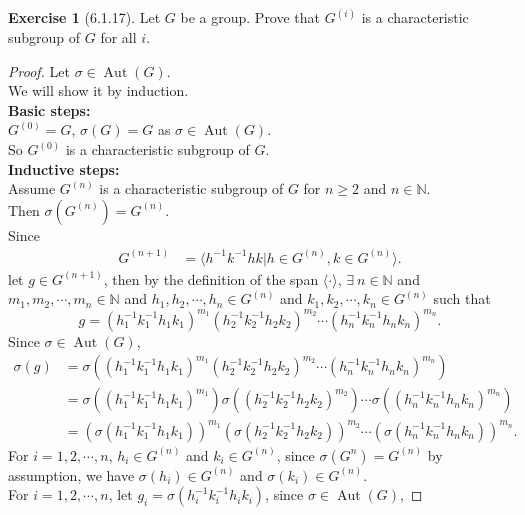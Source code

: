 \documentclass{amsart}
\newcommand{\bbn}{\mathbb{N}}
\theoremstyle{plain}
\theoremstyle{definition}
\newtheorem{exer}[lem]{Exercise}
\begin{document}
\begin{exer}[6.1.17]
Let $G$ be a group. 
Prove that $G^{(i)}$ is a characteristic subgroup of $G$ for all $i$. 
\begin{proof}
	Let $\sigma \in \operatorname{Aut}(G)$.\\
	We will show it by induction.\\
	\textbf{Basic steps:}\\
	$G^{(0)} = G$, $\sigma(G) = G$ as $\sigma\in \operatorname{Aut}(G)$.\\
	So $G^{(0)}$ is a characteristic subgroup of $G$.\\
	\textbf{Inductive steps:}\\
	Assume $G^{(n)}$ is a characteristic subgroup of $G$ for $n \geq 2$ and $n \in \bbn$.\\
	Then $\sigma(G^{(n)}) = G^{(n)}$.\\
	Since 
  	\begin{align*}
	  G^{(n+1)} &= \langle h^{-1}k^{-1}hk|h \in G^{(n)}, k \in G^{(n)}\rangle.
  	\end{align*}
  	let $g \in G^{(n+1)}$, then by the definition of the span $\langle\cdot\rangle$, $\exists \ n \in \bbn$ and $m_1,m_2,\cdots,m_n \in \bbn$ and $h_1,h_2,\cdots,h_n \in G^{(n)}$ and $k_1,k_2,\cdots,k_n \in G^{(n)}$ such that
  	\[g = \left(h_1^{-1}k_1^{-1}h_1k_1\right)^{m_1}\left(h_2^{-1}k_2^{-1}h_2k_2\right)^{m_2}\cdots \left(h_n^{-1}k_n^{-1}h_nk_n\right)^{m_n} .\]
  	Since $\sigma \in \operatorname{Aut}(G)$, 
  	\begin{align*}
  	  \sigma(g) &= \sigma \left(\left(h_1^{-1}k_1^{-1}h_1k_1\right)^{m_1}\left(h_2^{-1}k_2^{-1}h_2k_2\right)^{m_2}\cdots \left(h_n^{-1}k_n^{-1}h_nk_n\right)^{m_n}  \right)\\
  	  			  	   	&=\sigma \left(\left(h_1^{-1}k_1^{-1}h_1k_1\right)^{m_1}\right) \sigma \left(\left(h_2^{-1}k_2^{-1}h_2k_2\right)^{m_2}\right)\cdots \sigma\left(\left (h_n^{-1}k_n^{-1}h_nk_n\right) ^{m_n}\right)		\\
  	  			  	   &=\left(\sigma\left(h_1^{-1}k_1^{-1}h_1k_1\right)\right)^{m_1}  \left(\sigma\left(h_2^{-1}k_2^{-1}h_2k_2\right)\right)^{m_2}\cdots \left(\sigma\left (h_n^{-1}k_n^{-1}h_nk_n\right)\right) ^{m_n}.	
  	\end{align*}
  	For $i = 1,2,\cdots,n$, $h_i \in G^{(n)}$ and $k_i \in G^{(n)}$, since $\sigma(G^n) = G^{(n)}$ by assumption, we have $\sigma(h_i) \in G^{(n)}$ and $\sigma(k_i)\in G^{(n)}$.\\
  	For $i = 1,2,\cdots,n$, let $g_i = \sigma\left(h_i^{-1}k_i^{-1}h_ik_i\right)$, since $\sigma \in \operatorname{Aut}(G)$,

\end{proof}
\end{exer}
\end{document}
